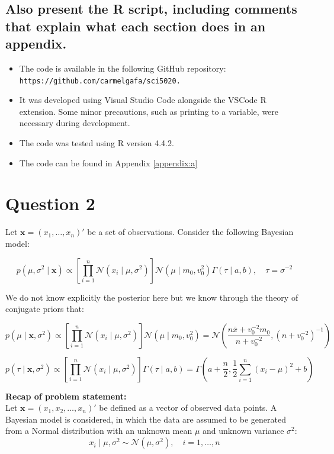 \documentclass[]{article}
\begin{document}
\subsection{Also present the R script, including comments that explain what each section does in
an appendix. }

\begin{itemize}
	\item The code is available in the following GitHub repository: \\ \texttt{https://github.com/carmelgafa/sci5020.}
	\item It was developed using Visual Studio Code alongside the VSCode R extension. Some minor precautions, such as printing to a variable, were necessary during development.
	\item The code was tested using R version 4.4.2.
	\item The code can be found in Appendix \ref{appendix:a}
\end{itemize}



	
\section{Question 2}

Let $ \textbf{x} = (x_1, \dots, x_n)'$ be a set of observations. Consider the following Bayesian model:

$$
p(\mu, \sigma^2 \mid \textbf{x}) 
\propto 
\left[ \prod_{i=1}^n \mathcal{N}(x_i \mid \mu, \sigma^2) \right] 
\mathcal{N}(\mu \mid m_0, v_0^2) 
\Gamma(\tau \mid a, b), 
\quad \tau = \sigma^{-2}
$$

We do not know explicitly the posterior here but we know through the theory of conjugate priors that:

$$
p(\mu \mid \textbf{x}, \sigma^2) 
\propto 
\left[ \prod_{i=1}^n \mathcal{N}(x_i \mid \mu, \sigma^2) \right] 
\mathcal{N}(\mu \mid m_0, v_0^2) = 
\mathcal{N} \left( \frac{n \bar{x} + v_0^{-2} m_0}{n + v_0^{-2}}, \left(n + v_0^{-2} \right)^{-1} \right)
$$

$$
p(\tau \mid \textbf{x}, \sigma^2) 
\propto 
\left[ \prod_{i=1}^n \mathcal{N}(x_i \mid \mu, \sigma^2) \right] 
\Gamma(\tau \mid a, b) = \Gamma\left( a + \frac{n}{2}, \frac{1}{2} \sum_{i=1}^n (x_i - \mu)^2 + b \right)
$$


\noindent \textbf{Recap of problem statement:}\\

Let $\mathbf{x} = (x_1, x_2, \dots, x_n)'$ be defined as a vector of observed data points. A Bayesian model is considered, in which the data are assumed to be generated from a Normal distribution with an unknown mean $\mu$ and unknown variance $\sigma^2$:
$$
x_i \mid \mu, \sigma^2 \sim \mathcal{N}(\mu, \sigma^2), \quad i = 1, \dots, n
$$
\end{document}
